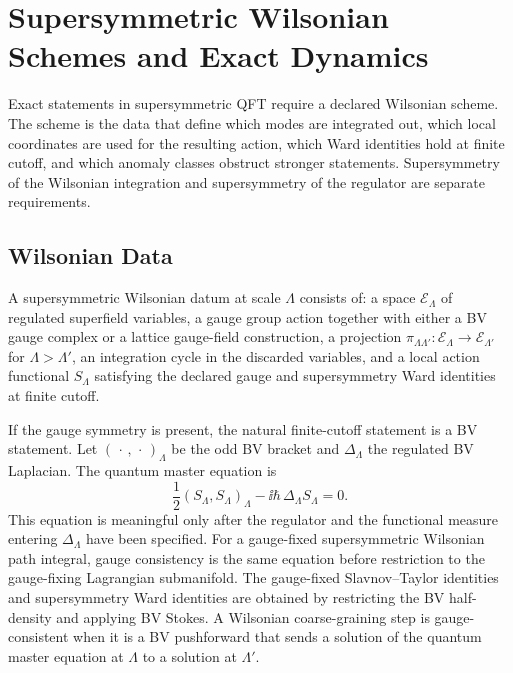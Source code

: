\chapter{Supersymmetric Wilsonian Schemes and Exact Dynamics}
\label{ch:susy-wilsonian-schemes-exact-dynamics}

\ConventionsLorentzian

Exact statements in supersymmetric QFT require a declared Wilsonian scheme.
The scheme is the data that define which modes are integrated out, which
local coordinates are used for the resulting action, which Ward identities
hold at finite cutoff, and which anomaly classes obstruct stronger
statements.  Supersymmetry of the Wilsonian integration and supersymmetry of
the regulator are separate requirements.

\section{Wilsonian Data}

\begin{definition}
\label{def:susy-wilsonian-datum}
A supersymmetric Wilsonian datum at scale \(\Lambda\) consists of:
a space \(\mathcal E_\Lambda\) of regulated superfield variables, a gauge
group action together with either a BV gauge complex or a lattice
gauge-field construction, a projection
\(\pi_{\Lambda\Lambda'}:\mathcal E_{\Lambda}\to\mathcal E_{\Lambda'}\) for
\(\Lambda>\Lambda'\), an integration cycle in the discarded variables, and a
local action functional \(S_\Lambda\) satisfying the declared gauge and
supersymmetry Ward identities at finite cutoff.
\end{definition}

If the gauge symmetry is present, the natural finite-cutoff statement is a BV
statement.  Let \((\,\cdot\,,\,\cdot\,)_\Lambda\) be the odd BV bracket and
\(\Delta_\Lambda\) the regulated BV Laplacian.  The quantum master equation is
\[
  \frac12(S_\Lambda,S_\Lambda)_\Lambda
  -\ii\hbar\,\Delta_\Lambda S_\Lambda=0 .
\]
This equation is meaningful only after the regulator and the functional
measure entering \(\Delta_\Lambda\) have been specified.
For a gauge-fixed supersymmetric Wilsonian path integral, gauge consistency is
the same equation before restriction to the gauge-fixing Lagrangian
submanifold.  The gauge-fixed Slavnov--Taylor identities and supersymmetry
Ward identities are obtained by restricting the BV half-density and applying
BV Stokes.  A Wilsonian coarse-graining step is gauge-consistent when it is a
BV pushforward that sends a solution of the quantum master equation at
\(\Lambda\) to a solution at \(\Lambda'\).

